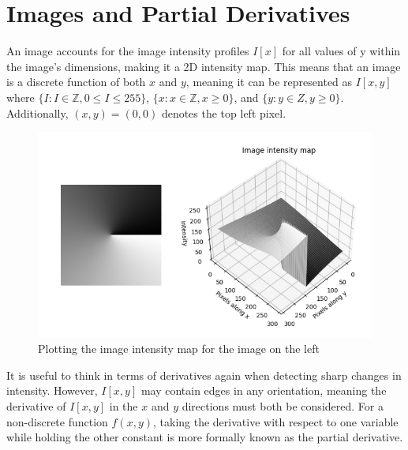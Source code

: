 \documentclass{article}
\begin{document}
\section{Images and Partial Derivatives}
\setcounter{equation}{0}
An image accounts for the image intensity profiles $I[x]$ for all values of y within the image's dimensions, making it a 2D intensity map. This means that an image is a discrete function of both $x$ and $y$, meaning it can be represented as $I[x,y]$ where $\{I:I \in \mathbb{Z}, 0 \le I \le 255\}$, $\{x:x \in \mathbb{Z}, x \ge 0\}$, and $\{y:y \in Z, y \ge 0\}$. Additionally, $(x,y)=(0,0)$ denotes the top left pixel.

\begin{figure}[!hbtp]
    \centering
    \includegraphics[width=\textwidth]{figures/figure05.png}
    \caption[Plotting the image intensity map for the image on the left]{Plotting the image intensity map for the image on the left}
    \label{fig:figure 5}
\end{figure}

It is useful to think in terms of derivatives again when detecting sharp changes in intensity. However, $I[x,y]$ may contain edges in any orientation, meaning the derivative of $I[x,y]$ in the $x$ and $y$ directions must both be considered. For a non-discrete function $f(x,y)$, taking the derivative with respect to one variable while holding the other constant is more formally known as the partial derivative.
\end{document}
